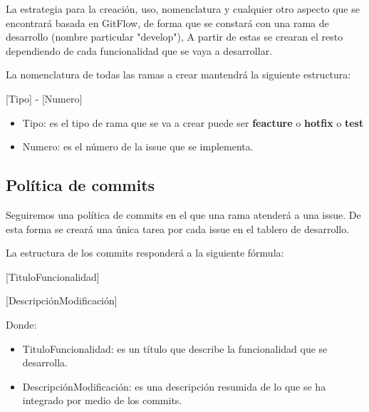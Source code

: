 La estrategia para la creación, uso, nomenclatura y cualquier otro aspecto que se encontrará basada en GitFlow, de forma que se constará con una rama de desarrollo (nombre particular "develop"), A partir de estas se crearan el resto dependiendo de cada funcionalidad que se vaya a desarrollar.

La nomenclatura de todas las ramas a crear mantendrá la siguiente estructura:

[Tipo] - [Numero]

\begin{itemize}
    \item Tipo: es el tipo de rama que se va a crear puede ser \textbf{feacture} o \textbf{hotfix} o \textbf{test}
    \item Numero: es el número de la issue que se implementa.
\end{itemize}

\subsection{Política de commits}

Seguiremos una política de commits en el que una rama atenderá a una issue. De esta forma se creará una única tarea por cada issue en el tablero de desarrollo.

La estructura de los commits responderá a la siguiente fórmula:

    [TituloFuncionalidad]

[DescripciónModificación]

Donde:
\begin{itemize}
    \item TituloFuncionalidad: es un título que describe la funcionalidad que se desarrolla.
    \item DescripciónModificación: es una descripción resumida de lo que se ha integrado por medio de los commits.
\end{itemize}
